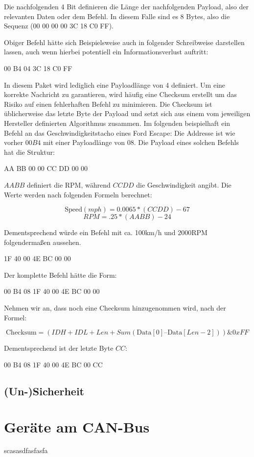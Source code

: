 \documentclass[
    fontsize=12pt,
    headings=small,
    parskip=half,           %
    bibliography=totoc,9
    numbers=noenddot,       %
    open=any,               %
    ]{scrreprt}
\begin{document}
Die nachfolgenden 4 Bit definieren die Länge der nachfolgenden Payload, also der relevanten Daten oder dem Befehl. In diesem Falle sind es 8 Bytes, also die Sequenz (00 00 00 00 3C 18 C0 FF).

Obiger Befehl hätte sich Beispielsweise auch in folgender Schreibweise darstellen lassen, auch wenn hierbei potentiell ein Informationsverlust auftritt:

\centerline{00 B4 04 3C 18 C0 FF}

In diesem Paket wird lediglich eine Payloadlänge von 4 definiert. Um eine korrekte Nachricht zu garantieren, wird häufig eine Checksum erstellt um das Risiko auf einen fehlerhaften Befehl zu minimieren. Die Checksum ist üblicherweise das letzte Byte der Payload und setzt sich aus einem vom jeweiligen Hersteller definierten Algorithmus zusammen.
Im folgenden beispielhaft ein Befehl an das Geschwindigkeitstacho eines Ford Escape:
Die Addresse ist wie vorher $00 B4$ mit einer Payloadlänge von $08$. Die Payload eines solchen Befehls hat die Struktur:

\centerline{AA BB 00 00 CC DD 00 00}

$AA BB$ definiert die RPM, während $CC DD$ die Geschwindigkeit angibt. Die Werte werden nach folgenden Formeln berechnet:

\[\text{Speed} (mph) = 0.0065 * (CC DD) - 67\]
\[RPM = .25 * (AA BB) - 24\]

Dementsprechend würde ein Befehl mit ca. 100km/h und 2000RPM folgendermaßen aussehen.

\centerline{1F 40 00 4E BC 00 00}

Der komplette Befehl hätte die Form:

\centerline{00 B4 08 1F 40 00 4E BC 00 00}

Nehmen wir an, dass noch eine Checksum hinzugenommen wird, nach der Formel:

\[\text{Checksum} = (IDH + IDL + Len + Sum(\text{Data}[0] – \text{Data}[Len-2])) \& 0xFF \]

Dementsprechend ist der letzte Byte $CC$:

\centerline{00 B4 08 1F 40 00 4E BC 00 CC}

\subsection{(Un-)Sicherheit}

\section{Geräte am CAN-Bus}
scasasdfasfasfa
\end{document}
